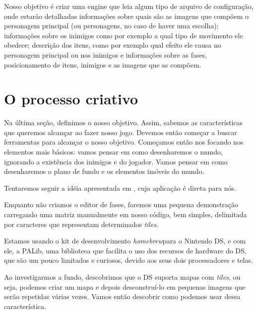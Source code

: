 \documentclass[brazil]{abnt}
\begin{document}
Nosso objetivo é criar uma engine que leia algum tipo de arquivo de configuração, onde estarão detalhadas informações sobre quais são as imagens que compõem o personagem principal (ou personagens, no caso de haver uma escolha); informações sobre os inimigos como por exemplo a qual tipo de movimento ele obedece; descrição dos itens, como por exemplo qual efeito ele causa no personagem principal ou nos inimigos e informações sobre as fases, posicionamento de itens, inimigos e as imagens que as compõem.

\section{O processo criativo}

Na última seção, definimos o nosso objetivo. Assim, sabemos as características que queremos alcançar ao fazer nosso jogo. Devemos então começar a buscar ferramentas para alcançar o nosso objetivo. Começamos então nos focando nos elementos mais básicos: vamos pensar em como desenharemos o mundo, ignorando a existência dos inimigos e do jogador. Vamos pensar em como desenharemos o plano de fundo e os elementos imóveis do mundo.

Tentaremos seguir a idéia apresentada em \cite{mameri06culling}, cuja aplicação é direta para nós.

Enquanto não criamos o editor de fases, faremos uma pequena demonstração carregando uma matriz manualmente em nosso código, bem simples, delimitada por caracteres que representam determinados \textit{tiles}.

Estamos usando o kit de desenvolvimento \textit{homebrew}\footnotemark para o Nintendo DS, e com ele, a PALib, uma biblioteca que facilita o uso dos recursos de hardware do DS, que são um pouco limitados e curiosos, devido aos seus dois processadores e telas.


Ao investigarmos a fundo, descobrimos que o DS suporta mapas com \textit{tiles}, ou seja, podemos criar um mapa e depois desconstruí-lo em pequenas imagens que serão repetidas várias vezes. Vamos então descobrir como podemos usar dessa característica. 
\end{document}
